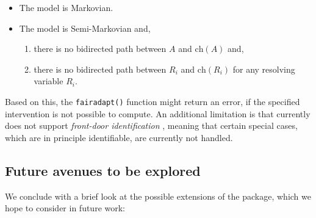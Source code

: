 \documentclass[
  nojss]{jss}
\providecommand{\tightlist}{%
  \setlength{\itemsep}{0pt}\setlength{\parskip}{0pt}}
\begin{document}
\begin{itemize}
\tightlist
\item
  The model is Markovian.
\item
  The model is Semi-Markovian and,

  \begin{enumerate}
  \def\labelenumi{(\roman{enumi})}
  \tightlist
  \item
    there is no bidirected path between \(A\) and \(\mathrm{ch}(A)\)
    and,
  \item
    there is no bidirected path between \(R_i\) and \(\mathrm{ch}(R_i)\)
    for any resolving variable \(R_i\).
  \end{enumerate}
\end{itemize}

Based on this, the \texttt{fairadapt()} function might return an error,
if the specified intervention is not possible to compute. An additional
limitation is that  currently does not support
\emph{front-door identification} \citep[Chapter~3]{pearl2009causality},
meaning that certain special cases, which are in principle identifiable,
are currently not handled.

\hypertarget{future-avenues-to-be-explored}{%
\subsection{Future avenues to be
explored}\label{future-avenues-to-be-explored}}

We conclude with a brief look at the possible extensions of the
 package, which we hope to consider in future work:
\end{document}
